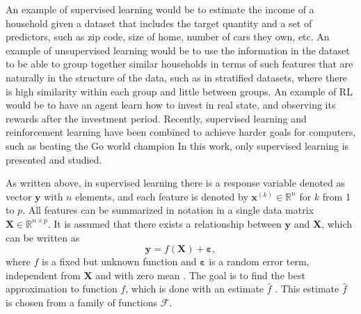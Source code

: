 An example of supervised learning would be to estimate the income of a household given a dataset that includes the target quantity and a set of predictors, such as zip code, size of home, number of cars they own, etc.
An example of unsupervised learning would be to use the information in the dataset to be able to group together similar households in terms of such features that are naturally in the structure of the data, such as in stratified datasets, where there is high similarity within each group and little between groups.
An example of RL would be to have an agent learn how to invest in real state, and observing its rewards after the investment period.
Recently, supervised learning and reinforcement learning have been combined to achieve harder goals for computers, such as beating the Go world champion \cite{silver2017mastering} In this work, only supervised learning is presented and studied.

As written above, in supervised learning there is a response variable denoted as vector $\boldsymbol{y}$ with $n$ elements, and each feature is denoted by $\boldsymbol{x}^{(k)} \in \mathbb{R}^n$ for $k$ from 1 to $p$. All features can be summarized in notation in a single data matrix $\boldsymbol{X} \in \mathbb{R}^{n \times p}$. It is assumed that there exists a relationship between $\boldsymbol{y}$ and $\boldsymbol{X}$, which can be written as
\begin{equation}
  \label{eq:general_learning_model}
  \boldsymbol{y} = f(\boldsymbol{X}) + \boldsymbol{\varepsilon},
\end{equation}
where $f$ is a fixed but unknown function and $\boldsymbol{\varepsilon}$ is a random error term, independent from $\boldsymbol{X}$ and with zero mean \cite[p.~16]{james2013introduction}.
The goal is to find the best approximation to function $f$, which is done with an estimate $\hat{f}$ \cite[p.~17]{james2013introduction}.
This estimate $\hat{f}$ is chosen from a family of functions $\mathcal{F}$.

